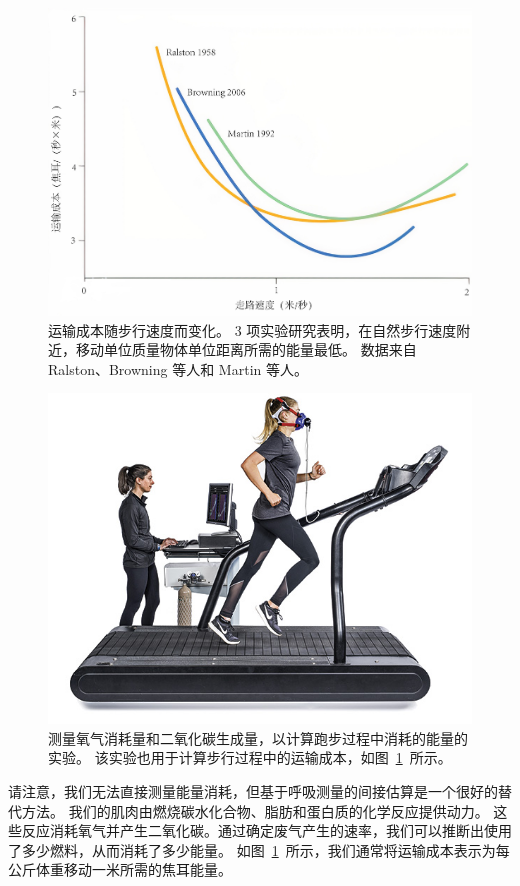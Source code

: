 \begin{figure}[!htb]
	\centering
	\includegraphics[width=0.8\linewidth]{chap2/2_11}
	\caption{运输成本随步行速度而变化。
		3 项实验研究表明，在自然步行速度附近，移动单位质量物体单位距离所需的能量最低。
		数据来自 Ralston\cite{ralston1958energy}、Browning 等人\cite{browning2006effects}和 Martin 等人\cite{martin1992effects}。 \label{fig:2_11}}
\end{figure}

\begin{figure}[!htb]
	\centering
	\includegraphics[width=1.0\linewidth]{chap2/2_12}
	\caption{测量氧气消耗量和二氧化碳生成量，以计算跑步过程中消耗的能量的实验。
		该实验也用于计算步行过程中的运输成本，如图~\ref{fig:2_11}~所示。 \label{fig:2_12}}
\end{figure}


请注意，我们无法直接测量能量消耗，但基于呼吸测量的间接估算是一个很好的替代方法。
我们的肌肉由燃烧碳水化合物、脂肪和蛋白质的化学反应提供动力。
这些反应消耗氧气并产生二氧化碳。通过确定废气产生的速率，我们可以推断出使用了多少燃料，从而消耗了多少能量。
如图~\ref{fig:2_11}~所示，我们通常将运输成本表示为每公斤体重移动一米所需的焦耳能量。



